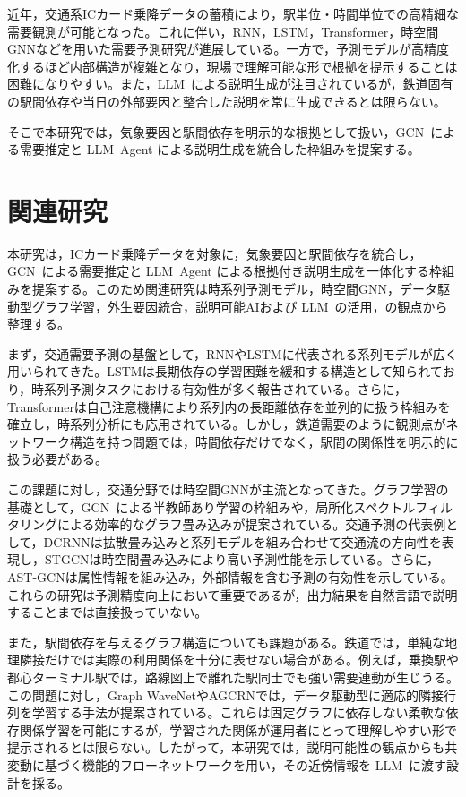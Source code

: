 \documentclass[technicalreport]{ieicej}
\newcommand{\LLM}{LLM}
\newcommand{\GCN}{GCN}
\begin{document}
近年，交通系ICカード乗降データの蓄積により，駅単位・時間単位での高精細な需要観測が可能となった。これに伴い，RNN，LSTM，Transformer，時空間GNNなどを用いた需要予測研究が進展している\cite{7508408,vaswani2017attention,10.5555/3304222.3304273}。一方で，予測モデルが高精度化するほど内部構造が複雑となり，現場で理解可能な形で根拠を提示することは困難になりやすい。また，\LLM\ による説明生成が注目されているが，鉄道固有の駅間依存や当日の外部要因と整合した説明を常に生成できるとは限らない\cite{guo2024towards}。

そこで本研究では，気象要因と駅間依存を明示的な根拠として扱い，\GCN\ による需要推定と \LLM\ Agent による説明生成を統合した枠組みを提案する。

\section{関連研究}
本研究は，ICカード乗降データを対象に，気象要因と駅間依存を統合し，\GCN\ による需要推定と \LLM\ Agent による根拠付き説明生成を一体化する枠組みを提案する。このため関連研究は時系列予測モデル，時空間GNN，データ駆動型グラフ学習，外生要因統合，説明可能AIおよび \LLM\ の活用，の観点から整理する。

まず，交通需要予測の基盤として，RNNやLSTMに代表される系列モデルが広く用いられてきた。LSTMは長期依存の学習困難を緩和する構造として知られており\cite{7508408,sherstinsky2020fundamentals,yu2019review}，時系列予測タスクにおける有効性が多く報告されている。さらに，Transformerは自己注意機構により系列内の長距離依存を並列的に扱う枠組みを確立し\cite{vaswani2017attention}，時系列分析にも応用されている。しかし，鉄道需要のように観測点がネットワーク構造を持つ問題では，時間依存だけでなく，駅間の関係性を明示的に扱う必要がある。

この課題に対し，交通分野では時空間GNNが主流となってきた。グラフ学習の基礎として，\GCN\ による半教師あり学習の枠組み\cite{kipf2016semi}や，局所化スペクトルフィルタリングによる効率的なグラフ畳み込み\cite{defferrard2016convolutional}が提案されている。交通予測の代表例として，DCRNNは拡散畳み込みと系列モデルを組み合わせて交通流の方向性を表現し\cite{li2017diffusion}，STGCNは時空間畳み込みにより高い予測性能を示している\cite{10.5555/3304222.3304273}。さらに，AST-GCNは属性情報を組み込み\cite{9363197}，外部情報を含む予測の有効性を示している。これらの研究は予測精度向上において重要であるが，出力結果を自然言語で説明することまでは直接扱っていない。

また，駅間依存を与えるグラフ構造についても課題がある。鉄道では，単純な地理隣接だけでは実際の利用関係を十分に表せない場合がある。例えば，乗換駅や都心ターミナル駅では，路線図上で離れた駅同士でも強い需要連動が生じうる。この問題に対し，Graph WaveNetやAGCRNでは，データ駆動型に適応的隣接行列を学習する手法が提案されている\cite{wu2019graph,bai2020adaptive}。これらは固定グラフに依存しない柔軟な依存関係学習を可能にするが，学習された関係が運用者にとって理解しやすい形で提示されるとは限らない。したがって，本研究では，説明可能性の観点からも共変動に基づく機能的フローネットワークを用い，その近傍情報を \LLM\ に渡す設計を採る。
\end{document}
